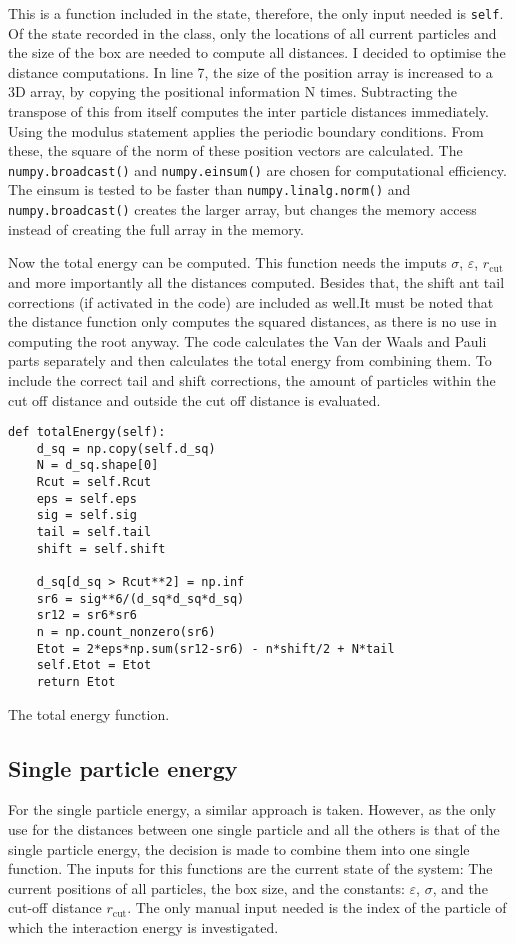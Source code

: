 This is a function included in the state, therefore, the only input needed is \texttt{self}. Of the state recorded in the class, only the locations of all current particles and the size of the box are needed to compute all distances. I decided to optimise the distance computations. In line 7, the size of the position array is increased to a 3D array, by copying the positional information N times. Subtracting the transpose of this from itself computes the inter particle distances immediately. Using the modulus statement applies the periodic boundary conditions. From these, the square of the norm of these position vectors are calculated. The \texttt{numpy.broadcast()} and \texttt{numpy.einsum()} are chosen for computational efficiency. The einsum is tested to be faster than \texttt{numpy.linalg.norm()} and \texttt{numpy.broadcast()} creates the larger array, but changes the memory access instead of creating the full array in the memory.

Now the total energy can be computed. This function needs the imputs $\sigma$, $\varepsilon$, $r_\text{cut}$ and more importantly all the distances computed. Besides that, the shift ant tail corrections (if activated in the code) are included as well.It must be noted that the distance function only computes the squared distances, as there is no use in computing the root anyway. The code calculates the Van der Waals and Pauli parts separately and then calculates the total energy from combining them. To include the correct tail and shift corrections, the amount of particles within the cut off distance and outside the cut off distance is evaluated.

\begin{listing}[ht!]
	\begin{verbatim}
def totalEnergy(self):
    d_sq = np.copy(self.d_sq)
	N = d_sq.shape[0]
	Rcut = self.Rcut
	eps = self.eps
	sig = self.sig
	tail = self.tail
	shift = self.shift
	
	d_sq[d_sq > Rcut**2] = np.inf
	sr6 = sig**6/(d_sq*d_sq*d_sq)
	sr12 = sr6*sr6
	n = np.count_nonzero(sr6) 
	Etot = 2*eps*np.sum(sr12-sr6) - n*shift/2 + N*tail
	self.Etot = Etot
	return Etot
	\end{verbatim}
\caption{The total energy function.}
	\label{Total energy function}
\end{listing}


\subsection{Single particle energy}
For the single particle energy, a similar approach is taken. However, as the only use for the distances between one single particle and all the others is that of the single particle energy, the decision is made to combine them into one single function. The inputs for this functions are the current state of the system: The current positions of all particles, the box size, and the constants: $\varepsilon$, $\sigma$, and the cut-off distance $r_\text{cut}$. The only manual input needed is the index of the particle of which the interaction energy is investigated.

